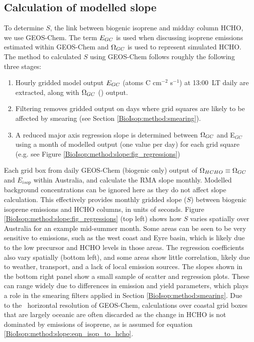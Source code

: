   \subsection{Calculation of modelled slope}
    \label{BioIsop:method:slope_calc}
    
    To determine $S$, the link between biogenic isoprene and midday column HCHO, we use GEOS-Chem.
    The term $E_{GC}$ is used when discussing isoprene emissions estimated within GEOS-Chem and $\Omega_{GC}$ is used to represent simulated HCHO.
    The method to calculated $S$ using GEOS-Chem follows roughly the following three stages: 
    \begin{enumerate}
      \item 
      Hourly gridded model output $E_{GC}$ (atoms C cm$^{-2}$ s$^{-1}$) at 13:00~LT daily are extracted, along with $\Omega_{GC}$  (\moleccm) output.
      \item
      Filtering removes gridded output on days where grid squares are likely to be affected by smearing (see Section \ref{BioIsop:method:smearing}).
      \item 
      A reduced major axis regression slope is determined between $\Omega_{GC}$ and E$_{GC}$ using a month of modelled output (one value per day) for each grid square (e.g. see Figure \ref{BioIsop:method:slope:fig_regressions})
    \end{enumerate}
    
    Each \lowhr grid box from daily GEOS-Chem (biogenic only) output of $\Omega_{HCHO} \equiv \Omega_{GC}$ and $E_{isop}$ within Australia, and calculate the RMA slope monthly.
    Modelled background concentrations can be ignored here as they do not affect slope calculation.
    This effectively provides monthly gridded slope ($S$) between biogenic isoprene emissions and HCHO columns, in units of seconds.
    Figure \ref{BioIsop:method:slope:fig_regressions} (top left) shows how $S$ varies spatially over Australia for an example mid-summer month.
    Some areas can be seen to be very sensitive to emissions, such as the west coast and Eyre basin, which is likely due to the low precursor and HCHO levels in those areas.
    The regression coefficients also vary spatially (bottom left), and some areas show little correlation, likely due to weather, transport, and a lack of local emission sources.
    The slopes shown in the bottom right panel show a small sample of scatter and regression plots. 
    These can range widely due to differences in emission and yield parameters, which plays a role in the smearing filters applied in Section \ref{BioIsop:method:smearing}.
    Due to the \lowhr ~horizontal resolution of GEOS-Chem, calculations over coastal grid boxes that are largely oceanic are often discarded as the change in HCHO is not dominated by emissions of isoprene, as is assumed for equation \ref{BioIsop:method:slope:eqn_isop_to_hcho}.
    
